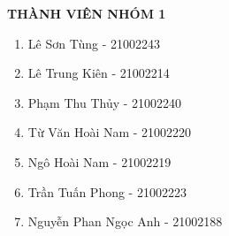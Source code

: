 %
% 
%
%
%
%



\lstset{style=codeC}	%
\frontmatter 			%
\pagestyle{plain} 



\begin{center}
	\bfseries 
	THÀNH VIÊN NHÓM 1
	\mdseries
\end{center}
\begin{enumerate}
	\item Lê Sơn Tùng - 21002243
	\item Lê Trung Kiên - 21002214
	\item Phạm Thu Thủy -  21002240
	\item Từ Văn Hoài Nam - 21002220
	\item Ngô Hoài Nam - 21002219
	\item Trần Tuấn Phong - 21002223
	\item Nguyễn Phan Ngọc Anh - 21002188
\end{enumerate}


